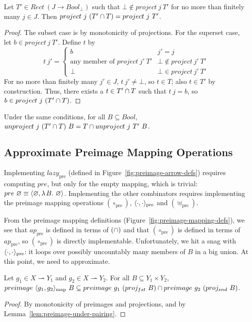 \documentclass[preprint]{sigplanconf}
\newcommand{\pto}{\rightharpoonup}
\newcommand{\arrowlazy}{\ensuremath{lazy}}
\newcommand{\map}{_\mathrm{map}}
\newcommand{\pre}{_\mathrm{pre}}
\newcommand{\lazypre}{\arrowlazy\pre}
\begin{document}
\begin{theorem}
Let $T' \in Rect~(J \to Bool_\bot)$ such that $\bot \notin project~j~T'$ for no more than finitely many $j \in J$.
Then $project~j~(T' \cap T) = project~j~T'$.
\end{theorem}
\begin{proof}
The subset case is by monotonicity of projections.
For the superset case, let $b \in project~j~T'$.
Define $t$ by
\begin{equation}
	t~j' =
	\begin{cases}
		b & j' = j \\
		\text{any member of } project~j'~T' & \bot \notin project~j'~T' \\
		\bot & \bot \in project~j'~T'
	\end{cases}
\end{equation}
For no more than finitely many $j' \in J$, $t~j' \neq \bot$, so $t \in T$; also $t \in T'$ by construction.
Thus, there exists a $t \in T' \cap T$ such that $t~j = b$, so $b \in project~j~(T' \cap T)$.
\end{proof}

\begin{corollary}
Under the same conditions, for all $B \subseteq Bool$, $unproject~j~(T' \cap T)~B = T \cap unproject~j~T'~B$.
\end{corollary}

\subsection{Approximate Preimage Mapping Operations}

Implementing $\lazypre$ (defined in Figure~\ref{fig:preimage-arrow-defs}) requires computing $pre$, but only for the empty mapping, which is trivial: $pre~\varnothing \equiv \langle{\varnothing,\lambda\mspace{2mu}{B}\ldotp\,\varnothing}\rangle$.
Implementing the other combinators requires implementing the preimage mapping operations $(\circ\pre)$, $\pair{\cdot,\cdot}\pre$ and $(\uplus\pre)$.

From the preimage mapping definitions (Figure~\ref{fig:preimage-mapping-defs}), we see that $ap\pre$ is defined in terms of $(\cap)$ and that $(\circ\pre)$ is defined in terms of $ap\pre$, so $(\circ\pre)$ is directly implementable.
Unfortunately, we hit a snag with $\pair{\cdot,\cdot}\pre$: it loops over possibly uncountably many members of $B$ in a big union.
At this point, we need to approximate.

\begin{theorem}
Let $g_1 \in X \pto Y_1$ and $g_2 \in X \pto Y_2$.
For all $B \subseteq Y_1 \times Y_2$, $preimage~\pair{g_1,g_2}\map~B \subseteq preimage~g_1~(proj_{fst}~B) \i preimage~g_2~(proj_{snd}~B)$.
\end{theorem}
\begin{proof}
By monotonicity of preimages and projections, and by Lemma~\ref{lem:preimage-under-pairing}.
\end{proof}
\end{document}

